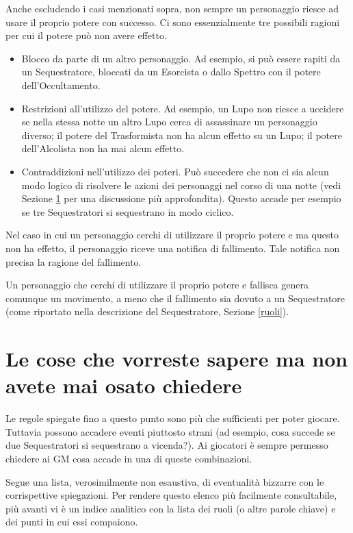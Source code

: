 \documentclass[a4paper,10pt]{article}
\begin{document}
Anche escludendo i casi menzionati sopra, non sempre un personaggio riesce ad usare il proprio potere con successo. Ci sono essenzialmente tre possibili ragioni per cui il potere può non avere effetto.

\begin{itemize}
	\item Blocco da parte di un altro personaggio. Ad esempio, si può essere rapiti da un Sequestratore, bloccati da un Esorcista o dallo Spettro con il potere dell'Occultamento.
	\item Restrizioni all'utilizzo del potere. Ad esempio, un Lupo non riesce a uccidere se nella stessa notte un altro Lupo cerca di assassinare un personaggio diverso; il potere del Trasformista non ha alcun effetto su un Lupo; il potere dell'Alcolista non ha mai alcun effetto.
	\item Contraddizioni nell'utilizzo dei poteri. Può succedere che non ci sia alcun modo logico di risolvere le azioni dei personaggi nel corso di una notte (vedi Sezione \ref{faq} per una discussione più approfondita). Questo accade per esempio se tre Sequestratori si sequestrano in modo ciclico.
\end{itemize}

Nel caso in cui un personaggio cerchi di utilizzare il proprio potere e ma questo non ha effetto, il personaggio riceve una notifica di fallimento. Tale notifica non precisa la ragione del fallimento.

Un personaggio che cerchi di utilizzare il proprio potere e fallisca genera comunque un movimento, a meno che il fallimento sia dovuto a un Sequestratore (come riportato nella descrizione del Sequestratore, Sezione \ref{ruoli}).

\pagebreak

\section{Le cose che vorreste sapere ma non avete mai osato chiedere}
\label{faq}

Le regole spiegate fino a questo punto sono più che sufficienti per poter giocare. Tuttavia possono accadere eventi piuttosto strani (ad esempio, cosa succede se due Sequestratori si sequestrano a vicenda?). Ai giocatori è sempre permesso chiedere ai GM cosa accade in una di queste combinazioni.

Segue una lista, verosimilmente non esaustiva, di eventualità bizzarre con le corrispettive spiegazioni.
Per rendere questo elenco più facilmente consultabile, più avanti vi è un indice analitico con la lista dei ruoli (o altre parole chiave) e dei punti in cui essi compaiono.
\end{document}

